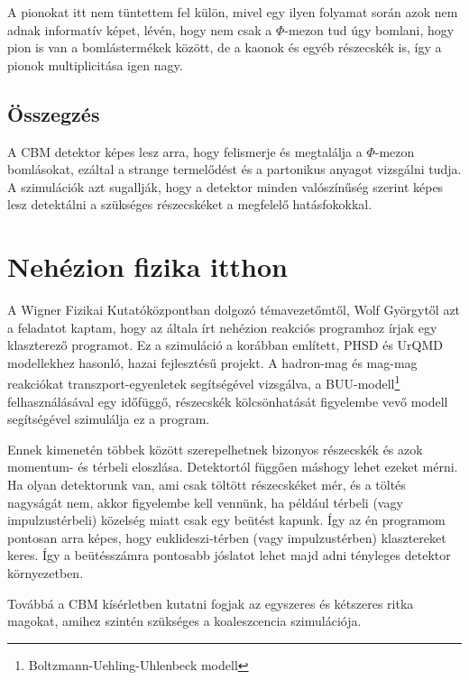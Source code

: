 \documentclass[a4paper,12pt]{article}
\begin{document}
\par A pionokat itt nem tüntettem fel külön, mivel egy ilyen folyamat során azok nem adnak informatív képet, lévén, hogy nem csak a 
$\Phi$-mezon tud úgy bomlani, hogy pion is van a bomlástermékek között, de a kaonok és egyéb részecskék is, így a pionok multiplicitása igen
nagy.
\subsection{ Összegzés}
\vspace{5mm}
\par A CBM detektor képes lesz arra, hogy felismerje és megtalálja a $\Phi$-mezon bomlásokat, ezáltal a strange termelődést és a 
partonikus anyagot vizsgálni tudja. A szimulációk azt sugallják, hogy a detektor minden valószínűség szerint képes lesz detektálni a 
szükséges részecskéket a megfelelő hatásfokokkal.
\section{ Nehézion fizika itthon }
\vspace{5mm}
\par A Wigner Fizikai Kutatóközpontban dolgozó témavezetőmtől, Wolf Györgytől azt a feladatot kaptam, hogy az általa írt nehézion reakciós
programhoz írjak egy klaszterező programot. Ez a szimuláció a korábban említett, PHSD és UrQMD modellekhez hasonló, hazai fejlesztésű
projekt. A hadron-mag és mag-mag reakciókat transzport-egyenletek segítségével vizsgálva, a BUU-modell\footnote{Boltzmann-Uehling-Uhlenbeck modell}
felhasználásával egy időfüggő, részecskék kölcsönhatását figyelembe vevő modell segítségével szimulálja ez a program.
\par Ennek kimenetén többek között szerepelhetnek bizonyos részecskék és azok momentum- és térbeli eloszlása. Detektortól függően
máshogy lehet ezeket mérni. Ha olyan detektorunk van, ami csak töltött részecskéket mér, és a töltés nagyságát nem, akkor figyelembe
kell vennünk, ha például térbeli (vagy impulzustérbeli) közelség miatt csak egy beütést kapunk. Így az én programom pontosan arra képes, hogy
euklideszi-térben (vagy impulzustérben) klasztereket keres. Így a beütésszámra pontosabb jóslatot lehet majd adni tényleges detektor
környezetben.
\par Továbbá a CBM kísérletben kutatni fogjak az egyszeres és kétszeres ritka magokat, amihez szintén szükséges a koaleszcencia szimulációja.
\end{document}
